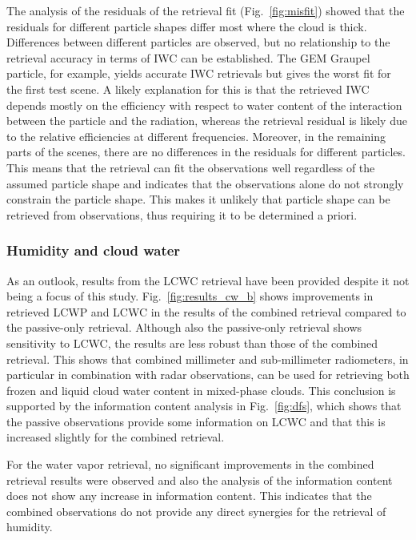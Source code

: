 \documentclass[journal abbreviation, manuscript]{copernicus}
\begin{document}
The analysis of the residuals of the retrieval fit (Fig.~\ref{fig:misfit})
showed that the residuals for different particle shapes differ most where the
cloud is thick. Differences between different particles are observed, but no
relationship to the retrieval accuracy in terms of IWC can be established. The
GEM Graupel particle, for example, yields accurate IWC retrievals but gives the
worst fit for the first test scene. A likely explanation for this is that the
retrieved IWC depends mostly on the efficiency with respect to water content of
the interaction between the particle and the radiation, whereas the retrieval
residual is likely due to the relative efficiencies at different frequencies.
Moreover, in the remaining parts of the scenes, there are no differences in the
residuals for different particles. This means that the retrieval can fit the
observations well regardless of the assumed particle shape and indicates that
the observations alone do not strongly constrain the particle shape. This 
makes it unlikely that particle shape can be retrieved from observations,
thus requiring it to be determined a priori.

\subsubsection{Humidity and cloud water}

As an outlook, results from the LCWC retrieval have been provided despite it not
being a focus of this study. Fig.~\ref{fig:results_cw_b} shows improvements in
retrieved LCWP and LCWC in the results of the combined retrieval compared to the
passive-only retrieval. Although also the passive-only retrieval shows
sensitivity to LCWC, the results are less robust than those of the combined
retrieval. This shows that combined millimeter and sub-millimeter radiometers,
in particular in combination with radar observations, can be used for retrieving
both frozen and liquid cloud water content in mixed-phase clouds. This
conclusion is supported by the information content analysis in
Fig.~\ref{fig:dfs}, which shows that the passive observations provide some
information on LCWC and that this is increased slightly for the combined retrieval.

For the water vapor retrieval, no significant improvements in the combined
retrieval results were observed and also the analysis of the information content
does not show any increase in information content. This indicates that the
combined observations do not provide any direct synergies for the retrieval of
humidity.
\end{document}
